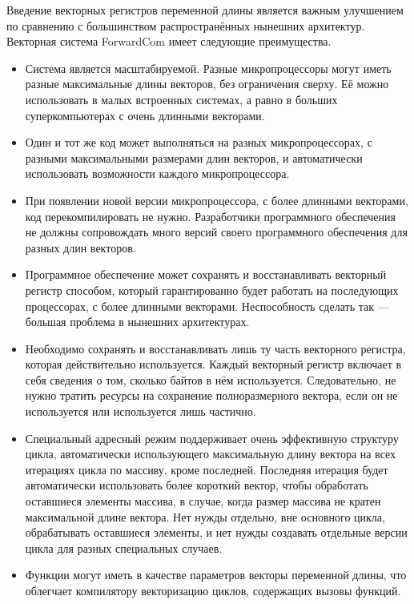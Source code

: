 \documentclass[forwardcom.tex]{subfiles}
\begin{document}
Введение векторных регистров переменной длины является важным улучшением по сравнению с большинством распространённых нынешних архитектур. Векторная система  ForwardCom имеет следующие преимущества.
\begin{itemize}
\item Система является масштабируемой. Разные микропроцессоры могут иметь разные максимальные длины векторов, без ограничения сверху. Её можно использовать в малых встроенных системах, а равно в больших суперкомпьютерах с очень длинными векторами.

\item Один и тот же код может выполняться на разных микропроцессорах, с разными максимальными размерами длин векторов, и автоматически использовать возможности каждого микропроцессора.

\item При появлении новой версии микропроцессора, с более длинными векторами, код перекомпилировать не нужно. Разработчики программного обеспечения не должны сопровождать много версий своего программного обеспечения для разных длин векторов.

\item Программное обеспечение может сохранять и восстанавливать векторный регистр способом, который гарантированно будет работать на последующих процессорах, с более длинными векторами. Неспособность сделать так --- большая проблема в нынешних архитектурах.

\item Необходимо сохранять и восстанавливать лишь ту часть векторного регистра, которая действительно используется. Каждый векторный регистр включает в себя сведения о том, сколько байтов в нём используется. Следовательно, не нужно тратить ресурсы на сохранение полноразмерного вектора, если он не используется или используется лишь частично.

\item Специальный адресный режим поддерживает очень эффективную структуру цикла, автоматически использующего максимальную длину вектора на всех итерациях цикла по массиву, кроме последней. Последняя итерация будет автоматически использовать более короткий вектор, чтобы обработать оставшиеся элементы массива, в случае, когда размер массива не кратен максимальной длине вектора.  Нет нужды отдельно, вне основного цикла, обрабатывать оставшиеся элементы, и нет нужды создавать отдельные версии цикла для разных специальных случаев.

\item Функции могут иметь в качестве параметров векторы переменной длины, что облегчает компилятору векторизацию циклов, содержащих вызовы функций.


\end{itemize}
\end{document}
